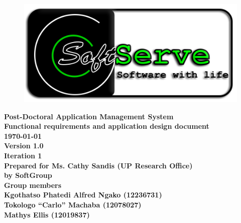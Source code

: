 \documentclass[12pt]{article}
\newcommand{\Title}{Functional requirements and application design document} %
\newcommand{\ssr}{Soft\color{green}{Serve }\color{black}}
\newcommand{\version}{1.0}
\newcommand{\iteration}{1}
\newcommand{\client}{Ms. Cathy Sandis (UP Research Office)}
\newcommand{\project}{Post-Doctoral Application Management System}
\begin{document}
\vspace{4em}

\begin{center}%

\begin{figure}[ht!]
\centering
\includegraphics{../Images_Docs/logo.png}
\end{figure}
\LARGE \bf \project \\[1em]
\LARGE \bf \Title \\[0.25em]
\large \bf \today\\
\bf Version \version\\
\bf Iteration \iteration\\[0.5em]
\Large \bf Prepared for \client\\
\Large \bf by
\Large {\bf \ssr Group }\\[0.5em]
\LARGE {\bf Group members}\\[0.25em]
\large
Kgothatso Phatedi Alfred Ngako (12236731) \\[0.5em]
Tokologo “Carlo” Machaba (12078027) \\[0.5em]
Mathys Ellis (12019837) \\[8em]

\end{center}%

\end{document}
